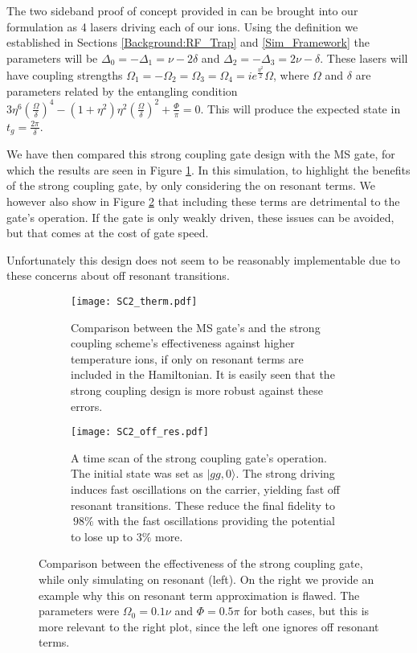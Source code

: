 \documentclass[12pt,twoside]{report}
\begin{document}
The two sideband proof of concept provided in \cite{SC_Paper} can be brought into our formulation as 4 lasers driving each of our ions. Using the definition we established in Sections \ref{Background:RF_Trap} and \ref{Sim_Framework} the parameters will be $\Delta_0 = -\Delta_1 = \nu - 2\delta$ and $\Delta_2 = -\Delta_3 = 2\nu-\delta$. These lasers will have coupling strengths ${\Omega_1 = -\Omega_2 = \Omega_3 = \Omega_4 = ie^{\frac{\eta^2}{2}}\Omega}$, where $\Omega$ and $\delta$ are parameters related by the entangling condition ${3\eta^6(\frac{\Omega}{\delta})^4 - (1 + \eta^2)\eta^2(\frac{\Omega}{\delta})^2 + \frac{\Phi}{\pi} = 0}$. This will produce the expected state in $t_g = \frac{2\pi}{\delta}$.

We have then compared this strong coupling gate design with the MS gate, for which the results are seen in Figure \ref{fig:sc2:comparison}. In this simulation, to highlight the benefits of the strong coupling gate, by only considering the on resonant terms. We however also show in Figure \ref{fig:sc2:time} that including these terms are detrimental to the gate's operation. If the gate is only weakly driven, these issues can be avoided, but that comes at the cost of gate speed.

Unfortunately this design does not seem to be reasonably implementable due to these concerns about off resonant transitions.

\begin{figure}[t!]
	\centering
	\begin{subfigure}[t]{0.475\textwidth}
		\centering
		\texttt{[image: SC2\_therm.pdf]}
		\caption{Comparison between the MS gate's and the strong coupling scheme's effectiveness against higher temperature ions, if only on resonant terms are included in the Hamiltonian. It is easily seen that the strong coupling design is more robust against these errors.}
		\label{fig:sc2:comparison}
	\end{subfigure}
	\hfill
	\begin{subfigure}[t]{0.475\textwidth}
		\centering
		\texttt{[image: SC2\_off\_res.pdf]}
		\caption{A time scan of the strong coupling gate's operation. The initial state was set as $|gg,0\rangle$. The strong driving induces fast oscillations on the carrier, yielding fast off resonant transitions. These reduce the final fidelity to $~98\%$ with the fast oscillations providing the potential to lose up to $3\%$ more.}
		\label{fig:sc2:time}
	\end{subfigure}
	\caption[Strong coupling design]{Comparison between the effectiveness of the strong coupling gate, while only simulating on resonant (left). On the right we provide an example why this on resonant term approximation is flawed. The parameters were $\Omega_0 = 0.1\nu$ and $\Phi=0.5\pi$ for both cases, but this is more relevant to the right plot, since the left one ignores off resonant terms.}
	\label{fig:sc2}
\end{figure}
\end{document}
